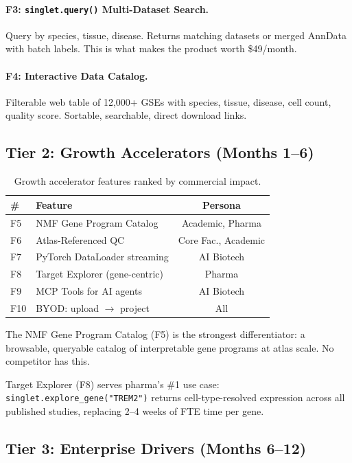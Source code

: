 \documentclass[10pt,twocolumn,letterpaper]{article}
\begin{document}
\paragraph{F3: \texttt{singlet.query()} Multi-Dataset Search.}
Query by species, tissue, disease. Returns matching datasets or merged AnnData
with batch labels. This is what makes the product worth \$49/month.

\paragraph{F4: Interactive Data Catalog.}
Filterable web table of 12,000+ GSEs with species, tissue, disease, cell count,
quality score. Sortable, searchable, direct download links.

\subsection{Tier 2: Growth Accelerators (Months 1--6)}

\begin{table}[h]
\centering
\small
\begin{tabular}{@{}llc@{}}
\toprule
\textbf{\#} & \textbf{Feature} & \textbf{Persona} \\
\midrule
F5 & NMF Gene Program Catalog & Academic, Pharma \\
F6 & Atlas-Referenced QC & Core Fac., Academic \\
F7 & PyTorch DataLoader streaming & AI Biotech \\
F8 & Target Explorer (gene-centric) & Pharma \\
F9 & MCP Tools for AI agents & AI Biotech \\
F10 & BYOD: upload $\to$ project & All \\
\bottomrule
\end{tabular}
\caption{Growth accelerator features ranked by commercial impact.}
\label{tab:features_t2}
\end{table}

The NMF Gene Program Catalog (F5) is the strongest differentiator: a browsable,
queryable catalog of interpretable gene programs at atlas scale. No competitor
has this.

Target Explorer (F8) serves pharma's \#1 use case:
\texttt{singlet.explore\_gene("TREM2")} returns cell-type-resolved expression
across all published studies, replacing 2--4 weeks of FTE time per gene.

\subsection{Tier 3: Enterprise Drivers (Months 6--12)}
\end{document}
